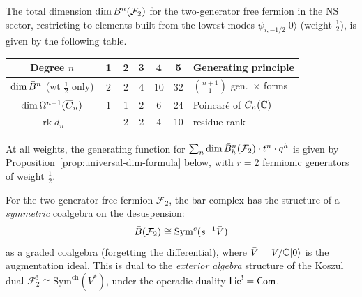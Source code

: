 \begin{computation}
\label{comp:fermion-dim-table}
The total dimension $\dim \bar{B}^n(\mathcal{F}_2)$ for the two-generator
free fermion in the NS sector, restricting to elements built
from the lowest modes $\psi_{i,-1/2}|0\rangle$ (weight $\tfrac{1}{2}$),
is given by the following table.

\begin{center}
\renewcommand{\arraystretch}{1.2}
\begin{tabular}{c|ccccc|l}
Degree $n$ & 1 & 2 & 3 & 4 & 5 & Generating principle \\
\hline
$\dim \bar{B}^n$ (wt $\frac{1}{2}$ only) & 2 & 2 & 4 & 10 & 32
  & $\binom{n+1}{1}$ gen.\ $\times$ forms \\
$\dim \Omega^{n-1}(\overline{C}_n)$ & 1 & 1 & 2 & 6 & 24
  & Poincar\'{e} of $C_n(\mathbb{C})$ \\
$\operatorname{rk} d_n$ & --- & 2 & 2 & 4 & 10 & residue rank
\end{tabular}
\end{center}

At all weights, the generating function for
$\sum_n \dim \bar{B}^n_h(\mathcal{F}_2) \cdot t^n \cdot q^h$ is given
by Proposition~\ref{prop:universal-dim-formula} below, with
$r = 2$ fermionic generators of weight $\frac{1}{2}$.
\end{computation}

\begin{proposition}
\label{prop:fermion-bar-symmetric}
For the two-generator free fermion $\mathcal{F}_2$, the bar complex
has the structure of a \emph{symmetric} coalgebra on the desuspension:
\begin{equation}\label{eq:fermion-bar-symcoalg}
\bar{B}(\mathcal{F}_2) \cong \mathrm{Sym}^c(s^{-1}\bar{V})
\end{equation}
as a graded coalgebra (forgetting the differential), where
$\bar{V} = V/\mathbb{C}|0\rangle$ is the augmentation ideal.
This is dual to the \emph{exterior algebra} structure of the
Koszul dual $\mathcal{F}_2^! \cong
\mathrm{Sym}^{\mathrm{ch}}(V^*)$, under the operadic duality
$\mathsf{Lie}^! = \mathsf{Com}$.
\end{proposition}

